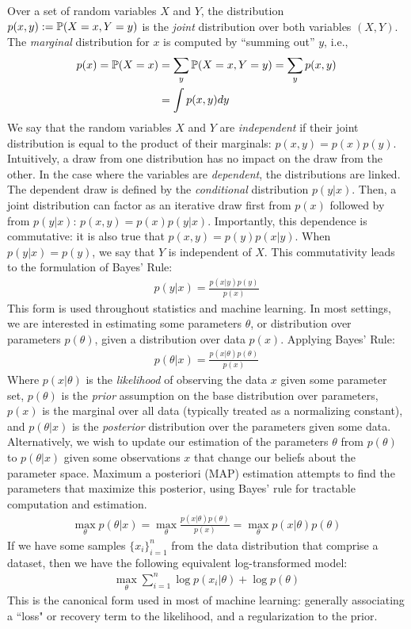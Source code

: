 Over a set of random variables $X$ and $Y$, the distribution $p(x,y):= \mathbb{P}(X=x,Y=y)$ is the \textit{joint} distribution over both variables $(X,Y)$. The \textit{marginal} distribution for $x$ is computed by ``summing out'' $y$, i.e.,
\begin{align}
p(x) = \mathbb{P}(X=x) &= \sum_y \mathbb{P}(X=x,Y=y) = \sum_y p(x,y) \\
&= \int p(x,y) dy
\end{align}
We say that the random variables $X$ and $Y$ are \textit{independent}
if their joint distribution is equal to the product of their marginals: $p(x,y) = p(x)p(y)$.
Intuitively, a draw from one distribution has no impact on the draw from the other.
In the case where the variables are \textit{dependent}, the distributions are linked.
The dependent draw is defined by the \textit{conditional} distribution $p(y|x)$.
Then, a joint distribution can factor as
an iterative draw first from $p(x)$ followed by from $p(y|x)$: $p(x,y) = p(x)p(y|x)$.
Importantly, this dependence is commutative:
it is also true that $p(x,y) = p(y)p(x|y)$.
When $p(y|x) = p(y)$, we say that $Y$ is independent of $X$.
This commutativity leads to the formulation of Bayes' Rule:
\begin{align}
    p(y|x) = \frac{p(x|y)p(y)}{p(x)}
\end{align}
This form is used throughout statistics and machine learning.
In most settings, we are interested in estimating some parameters $\theta$,
or distribution over parameters $p(\theta)$, given a distribution over data $p(x)$.
Applying Bayes' Rule:
\begin{align}
    p(\theta|x) = \frac{p(x|\theta)p(\theta)}{p(x)}
\end{align}
Where $p(x|\theta)$ is the \textit{likelihood} of observing the data $x$ given some parameter set,
$p(\theta)$ is the \textit{prior} assumption on the base distribution over parameters,
$p(x)$ is the marginal over all data (typically treated as a normalizing constant),
and $p(\theta|x)$ is the \textit{posterior} distribution over the parameters given some data.
Alternatively, we wish to update our estimation of the parameters $\theta$
from $p(\theta)$ to $p(\theta|x)$ given some observations $x$ that change our beliefs about the parameter space.
Maximum a posteriori (MAP) estimation attempts
to find the parameters that maximize this posterior,
using Bayes' rule for tractable computation and estimation.
\begin{align}\label{eq:map}
	\max_\theta p(\theta|x) = \max_\theta \frac{p(x|\theta)p(\theta)}{p(x)} =  \max_\theta p(x|\theta)p(\theta)
\end{align}
If we have some samples $\{x_i\}_{i=1}^n$ from the data distribution that comprise a dataset,
then we have the following equivalent log-transformed model:
\begin{align}
	\max_\theta \sum_{i=1}^n \log p(x_i|\theta) + \log p(\theta)
\end{align}
This is the canonical form used in most of machine learning:
generally associating a ``loss" or recovery term to the likelihood,
and a regularization to the prior.


